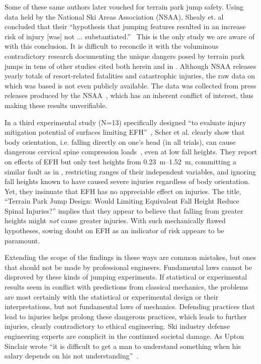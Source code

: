 \documentclass[smallextended]{svjour3}       %
\begin{document}
Some of these same authors later vouched for terrain park jump safety. Using
data held by the National Ski Areas Association (NSAA), Shealy et.
al~\cite{Shealy2015} concluded that their ``hypothesis that jumping features
resulted in an increase risk of injury [was] not ...
substantiated.''~\cite{Shealy2015} This is the only study we are aware of with
this conclusion. It is difficult to reconcile it with the voluminous
contradictory research documenting the unique dangers posed by terrain park
jumps in tens of other studies cited both herein and in
\cite{Hubbard2009,Swedberg2012,McNeil2012,McNeil2012a,Hubbard2015,Levy2015,Petrone2017,Moore2018}.
Although NSAA releases yearly totals of resort-related fatalities and
catastrophic injuries, the raw data on which \cite{Shealy2015} was
based is not even publicly available. The data was collected from press releases produced by the NSAA~\cite{Shealy2015}, which has an inherent conflict of interest, thus making these results unverifiable.

In a third experimental study (N=13) specifically designed ``to evaluate injury
mitigation potential of surfaces limiting EFH''~\cite{Scher2015}, Scher et al.
clearly show that body orientation, i.e. falling directly on one's head (in all
trials), can cause dangerous cervical spine compression loads~\cite{Scher2015},
even at low fall heights. They report on effects of EFH but only test heights
from \SIrange{0.23}{1.52}{\meter}, committing a similar fault as in
\cite{Shealy2010}, restricting ranges of their independent variables, and
ignoring fall heights known to have caused severe injuries regardless of body
orientation. Yet, they insinuate that EFH has no appreciable effect on injuries.
The title, ``Terrain Park Jump Design: Would Limiting Equivalent Fall Height
Reduce Spinal Injuries?'' implies that they appear to believe that falling from
greater heights might \emph{not} cause greater injuries. With such
mechanically flawed hypotheses, sowing doubt on EFH as an indicator of risk appears to be paramount.

Extending the scope of the findings in these ways are common mistakes, but ones that should not be made by professional engineers. Fundamental laws cannot be disproved by these kinds of jumping experiments. If statistical or experimental results seem in conflict with predictions from classical mechanics, the problems are most certainly with the statistical or experimental design or their interpretations, but not fundamental laws of mechanics. Defending practices that lead to injuries helps prolong these dangerous practices, which leads to further injuries, clearly contradictory to ethical engineering. Ski industry defense engineering experts are complicit in the continued societal damage. As Upton Sinclair wrote ``it is difficult to get a man to understand something when his salary depends on his not understanding''~\cite{Sinclair1994}.
\end{document}
